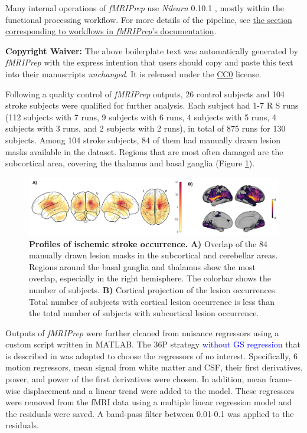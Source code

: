 \documentclass[fleqn,10pt]{wlscirep}
\begin{document}
Many internal operations of \emph{fMRIPrep} use \emph{Nilearn} 0.10.1
\citep[RRID:SCR\_001362]{abraham2014machine}, mostly within the functional
processing workflow. For more details of the pipeline, see
\href{https://fmriprep.readthedocs.io/en/latest/workflows.html}{the
section corresponding to workflows in \emph{fMRIPrep}'s documentation}.

\textbf{Copyright Waiver:} The above boilerplate text was automatically generated by \emph{fMRIPrep} with the express intention that users should copy and paste
this text into their manuscripts \emph{unchanged}. It is released under
the \href{https://creativecommons.org/publicdomain/zero/1.0/}{CC0}
license.


Following a quality control of \emph{fMRIPrep} outputs, 26 control subjects and 104 stroke subjects were qualified for further analysis. Each subject had 1-7 R S runs (112 subjects with 7 runs, 9 subjects with 6 runs, 4 subjects with 5 runs, 4 subjects with 3 runs, and 2 subjects with 2 runs), in total of 875 runs for 130 subjects. Among 104 stroke subjects, 84 of them had manually drawn lesion masks available in the dataset. Regions that are most often damaged are the subcortical area, covering the thalamus and basal ganglia (Figure \ref{fig:lesion_locations}).
\begin{figure}[]
\centering
\includegraphics[width=1\textwidth]{figures/lesion_locations.png}
\caption{\label{fig:lesion_locations} \textbf{Profiles of ischemic stroke occurrence.} \textbf{A) } Overlap of the 84 manually drawn lesion masks in the subcortical and cerebellar areas. Regions around the basal ganglia and thalamus show the most overlap, especially in the right hemisphere. The colorbar shows the number of subjects. \textbf{B) } Cortical projection of the lesion occurrences. Total number of subjects with cortical lesion occurrence is less than the total number of subjects with subcortical lesion occurrence.  } 
\end{figure}


Outputs of \emph{fMRIPrep} were further cleaned from nuisance regressors using a custom script written in MATLAB. The 36P strategy \textcolor{blue}{without GS regression} that is described in \citet{satterthwaite_2013} was adopted to choose the regressors of no interest. Specifically, 6 motion regressors, mean signal from white matter and CSF, their first derivatives, power, and power of the first derivatives were chosen. In addition, mean frame-wise displacement and a linear trend were added to the model. These regressors were removed from the fMRI data using a multiple linear regression model and the residuals were saved. A band-pass filter between 0.01-0.1 was applied to the residuals. 
\end{document}
